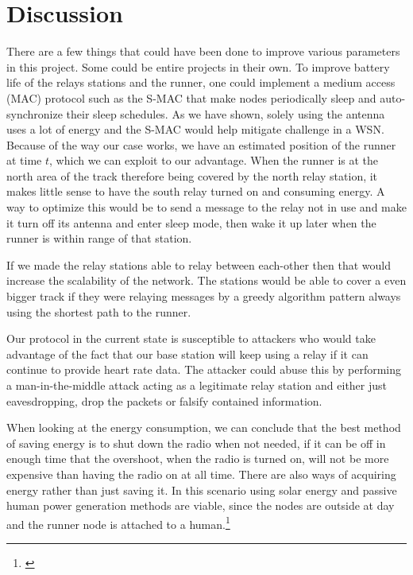\section{Discussion}

There are a few things that could have been done to improve various parameters in this project. Some could be entire projects in their own. To improve battery life of the relays stations and the runner, one could implement a medium access (MAC) protocol such as the S-MAC that make nodes periodically sleep and auto-synchronize their sleep schedules. As we have shown, solely using the antenna uses a lot of energy and the S-MAC would help mitigate challenge in a WSN. Because of the way our case works, we have an estimated position of the runner at time $t$, which we can exploit to our advantage. When the runner is at the north area of the track therefore being covered by the north relay station, it makes little sense to have the south relay turned on and consuming energy. A way to optimize this would be to send a message to the relay not in use and make it turn off its antenna and enter sleep mode, then wake it up later when the runner is within range of that station.

\noindent If we made the relay stations able to relay between each-other then that would increase the scalability of the network. The stations would be able to cover a even bigger track if they were relaying messages by a greedy algorithm pattern always using the shortest path to the runner.

\noindent Our protocol in the current state is susceptible to attackers who would take advantage of the fact that our base station will keep using a relay if it can continue to provide heart rate data. The attacker could abuse this by performing a man-in-the-middle attack acting as a legitimate relay station and either just eavesdropping, drop the packets or falsify contained information.

\noindent When looking at the energy consumption, we can conclude that the best method of saving energy is to shut down the radio when not needed, if it can be off in enough time that the overshoot, when the radio is turned on, will not be more expensive than having the radio on at all time. There are also ways of acquiring energy rather than just saving it. In this scenario using solar energy and passive human power generation methods are viable, since the nodes are outside at day and the runner node is attached to a human.\footnote{\cite{Sudevalayam2011}}
